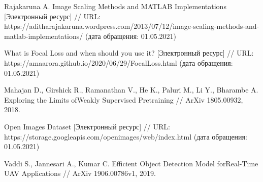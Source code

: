 \begin{thebibliography}{00}
    Rajakaruna A.
    Image Scaling Methods and MATLAB Implementations
    [Электронный ресурс] //
    URL: https://aditharajakaruna.wordpress.com/2013/07/12/image-scaling-methods-and-matlab-implementations/
    (дата обращения: 01.05.2021)

    What is Focal Loss and when should you use it?
    [Электронный ресурс] //
    URL: https://amaarora.github.io/2020/06/29/FocalLoss.html
    (дата обращения: 01.05.2021)

    Mahajan D., Girshick R., Ramanathan V., He K., Paluri M., Li Y., Bharambe A.  
    Exploring the Limits ofWeakly Supervised Pretraining //
    ArXiv 1805.00932, 2018.

    Open Images Dataset
    [Электронный ресурс] //
    URL: https://storage.googleapis.com/openimages/web/index.html
    (дата обращения: 01.05.2021)

    Vaddi S., Jannesari A., Kumar C.
    Efficient Object Detection Model forReal-Time UAV Applications //
    ArXiv 1906.00786v1, 2019.
    
\end{thebibliography}
\endgroup

\clearpage